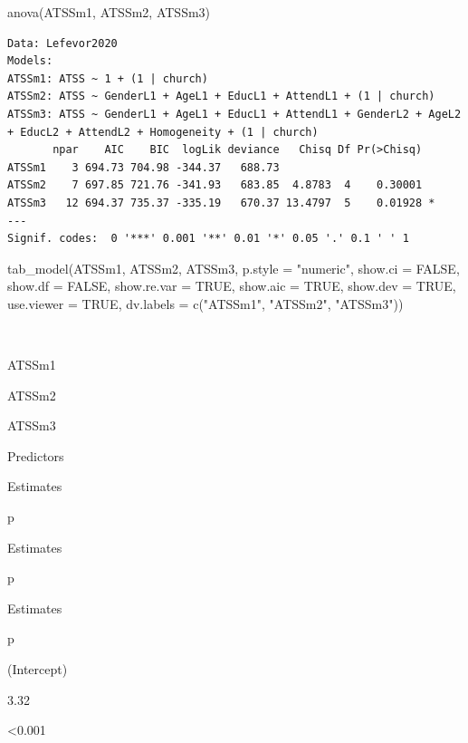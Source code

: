 \documentclass[
  11pt,
]{book}
\newenvironment{Shaded}{\begin{snugshade}}{\end{snugshade}}
\newcommand{\AttributeTok}[1]{\textcolor[rgb]{0.77,0.63,0.00}{#1}}
\newcommand{\ConstantTok}[1]{\textcolor[rgb]{0.00,0.00,0.00}{#1}}
\newcommand{\FunctionTok}[1]{\textcolor[rgb]{0.00,0.00,0.00}{#1}}
\newcommand{\NormalTok}[1]{#1}
\newcommand{\StringTok}[1]{\textcolor[rgb]{0.31,0.60,0.02}{#1}}
\begin{document}
\begin{Shaded}
\begin{Highlighting}[]
\FunctionTok{anova}\NormalTok{(ATSSm1, ATSSm2, ATSSm3) }
\end{Highlighting}
\end{Shaded}

\begin{verbatim}
Data: Lefevor2020
Models:
ATSSm1: ATSS ~ 1 + (1 | church)
ATSSm2: ATSS ~ GenderL1 + AgeL1 + EducL1 + AttendL1 + (1 | church)
ATSSm3: ATSS ~ GenderL1 + AgeL1 + EducL1 + AttendL1 + GenderL2 + AgeL2 + EducL2 + AttendL2 + Homogeneity + (1 | church)
       npar    AIC    BIC  logLik deviance   Chisq Df Pr(>Chisq)  
ATSSm1    3 694.73 704.98 -344.37   688.73                        
ATSSm2    7 697.85 721.76 -341.93   683.85  4.8783  4    0.30001  
ATSSm3   12 694.37 735.37 -335.19   670.37 13.4797  5    0.01928 *
---
Signif. codes:  0 '***' 0.001 '**' 0.01 '*' 0.05 '.' 0.1 ' ' 1
\end{verbatim}

\begin{Shaded}
\begin{Highlighting}[]
\FunctionTok{tab\_model}\NormalTok{(ATSSm1, ATSSm2, ATSSm3, }\AttributeTok{p.style =} \StringTok{"numeric"}\NormalTok{, }\AttributeTok{show.ci =} \ConstantTok{FALSE}\NormalTok{, }\AttributeTok{show.df =} \ConstantTok{FALSE}\NormalTok{, }\AttributeTok{show.re.var =} \ConstantTok{TRUE}\NormalTok{, }\AttributeTok{show.aic =} \ConstantTok{TRUE}\NormalTok{, }\AttributeTok{show.dev =} \ConstantTok{TRUE}\NormalTok{, }\AttributeTok{use.viewer =} \ConstantTok{TRUE}\NormalTok{, }\AttributeTok{dv.labels =} \FunctionTok{c}\NormalTok{(}\StringTok{"ATSSm1"}\NormalTok{, }\StringTok{"ATSSm2"}\NormalTok{, }\StringTok{"ATSSm3"}\NormalTok{))}
\end{Highlighting}
\end{Shaded}

~

ATSSm1

ATSSm2

ATSSm3

Predictors

Estimates

p

Estimates

p

Estimates

p

(Intercept)

3.32

\textless0.001
\end{document}
